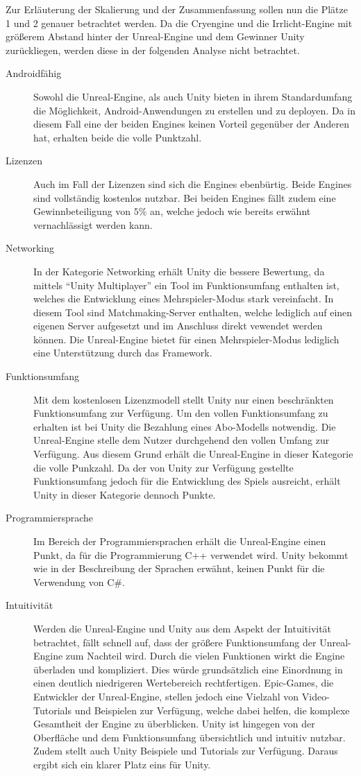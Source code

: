 	Zur Erläuterung der Skalierung und der Zusammenfassung sollen nun die Plätze 1 und 2 genauer betrachtet werden.
	Da die Cryengine und die Irrlicht-Engine mit größerem Abstand hinter der Unreal-Engine und dem Gewinner Unity zurückliegen, werden diese in der folgenden Analyse nicht betrachtet.
	\begin{description}
		\item[Androidfähig]{Sowohl die Unreal-Engine, als auch Unity bieten in ihrem Standardumfang die Möglichkeit, Android-Anwendungen zu erstellen und zu deployen. Da in diesem Fall eine der beiden Engines keinen Vorteil gegenüber der Anderen hat, erhalten beide die volle Punktzahl.}
		\item[Lizenzen]{Auch im Fall der Lizenzen sind sich die Engines ebenbürtig. Beide Engines sind vollständig kostenlos nutzbar. Bei beiden Engines fällt zudem eine Gewinnbeteiligung von $5$\% an, welche jedoch wie bereits erwähnt vernachlässigt werden kann.}
		\item[Networking]{In der Kategorie Networking erhält Unity die bessere Bewertung, da mittels \enquote{Unity Multiplayer} ein Tool im Funktionsumfang enthalten ist, welches die Entwicklung eines Mehrspieler-Modus stark vereinfacht. In diesem Tool sind Matchmaking-Server enthalten, welche lediglich auf einen eigenen Server aufgesetzt und im Anschluss direkt vewendet werden können. Die Unreal-Engine bietet für einen Mehrspieler-Modus lediglich eine Unterstützung durch das Framework.}
		\item[Funktionsumfang]{Mit dem kostenlosen Lizenzmodell stellt Unity nur einen beschränkten Funktionsumfang zur Verfügung. Um den vollen Funktionsumfang zu erhalten ist bei Unity die Bezahlung eines Abo-Modells notwendig. Die Unreal-Engine stelle dem Nutzer durchgehend den vollen Umfang zur Verfügung. Aus diesem Grund erhält die Unreal-Engine in dieser Kategorie die volle Punkzahl. Da der von Unity zur Verfügung gestellte Funktionsumfang jedoch für die Entwicklung des Spiels ausreicht, erhält Unity in dieser Kategorie dennoch Punkte.}
		\item[Programmiersprache]{Im Bereich der Programmiersprachen erhält die Unreal-Engine einen Punkt, da für die Programmierung C++ verwendet wird. Unity bekommt wie in der Beschreibung der Sprachen erwähnt, keinen Punkt für die Verwendung von C\#.}
		\item[Intuitivität]{Werden die Unreal-Engine und Unity aus dem Aspekt der Intuitivität betrachtet, fällt schnell auf, dass der größere Funktionsumfang der Unreal-Engine zum Nachteil wird. Durch die vielen Funktionen wirkt die Engine überladen und kompliziert. Dies würde grundsätzlich eine Einordnung in einen deutlich niedrigeren Wertebereich rechtfertigen. Epic-Games, die Entwickler der Unreal-Engine, stellen jedoch eine Vielzahl von Video-Tutorials und Beispielen zur Verfügung, welche dabei helfen, die komplexe Gesamtheit der Engine zu überblicken. Unity ist hingegen von der Oberfläche und dem Funktionsumfang übersichtlich und intuitiv nutzbar. Zudem stellt auch Unity Beispiele und Tutorials zur Verfügung. Daraus ergibt sich ein klarer Platz eins für Unity.}

\end{description}
